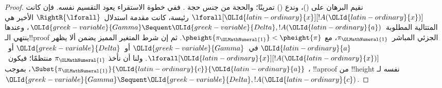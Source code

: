 \documentclass[../../../include/open-logic-section]{subfiles}
\begin{document}
\begin{proof}
نقيم البرهان على ()، وندع () تمرينًا؛ والحجة من جنس حجة
. ففي خطوة الاستقراء يعود التقسيم نفسه. فإن كانت
$\lforall[\OLId{latin-ordinary}{x}][!A(\OLId{latin-ordinary}{x})]$ رئيسة، كانت مقدمة استدلال~$\RightR{\lforall}$
الأخير هي المتتالية المطلوبة~$\OLId{greek-variable}{Gamma}\Sequent\OLId{greek-variable}{Delta},!A(\OLId{latin-ordinary}{a})$، وعندها ينتهي
الـ!!{proof} الجزئي المباشر~$\pi_\OLMathNumeral{1}$، مع
$\pheight{\pi_\OLMathNumeral{1}}<\pheight{\pi}$. ثم إن شرط المتغير المميز يضمن ألا يظهر
$\OLId{latin-ordinary}{a}$ في~$\OLId{greek-variable}{Gamma}$ أو~$\OLId{greek-variable}{Delta}$ أو~$\lforall[\OLId{latin-ordinary}{x}][!A(\OLId{latin-ordinary}{x})]$. ولنا أن نأخذ
$\pi_\OLMathNumeral{1}$ منتظمًا؛ فيكون~$\Subst{\pi_\OLMathNumeral{1}}{\OLId{latin-ordinary}{c}}{\OLId{latin-ordinary}{a}}$، بموجب
، !!a{proof} من !!{height} نفسه
لـ$\OLId{greek-variable}{Gamma}\Sequent\OLId{greek-variable}{Delta},!A(\OLId{latin-ordinary}{c})$.


\end{proof}
\end{document}

